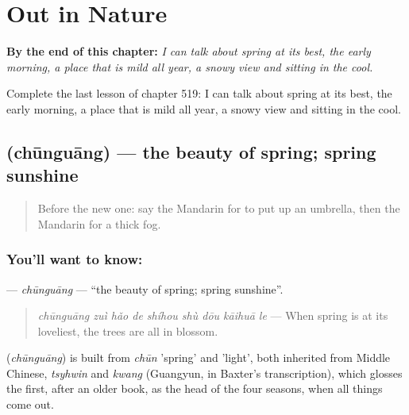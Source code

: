 
\chapter{Out in Nature}
\label{ch:zh-out-in-nature}

\begin{chapteropening}
\textbf{By the end of this chapter:} \emph{I can talk about spring at its best, the early morning, a place that is mild all year, a snowy view and sitting in the cool.}

Complete the last lesson of chapter 519: I can talk about spring at its best, the early morning, a place that is mild all year, a snowy view and sitting in the cool.
\end{chapteropening}

\section[\texorpdfstring{\zh{春光} (chūnguāng)}{春光 (chūnguāng)}]{ (chūnguāng) — the beauty of spring; spring sunshine}

\label{lesson:ZH-C519-chunguang}



\begin{quote}
Before the new one: say the Mandarin for to put up an umbrella, then the Mandarin for a thick fog.
\end{quote}

\subsection*{You'll want to know: }
\textbf{} — \emph{chūnguāng} — \textquotedblleft{}the beauty of spring; spring sunshine\textquotedblright{}.

\begin{quote}
\textbf{} \emph{chūnguāng zuì hǎo de shíhou shù dōu kāihuā le} — When spring is at its loveliest, the trees are all in blossom.
\end{quote}

\begin{cousinweb}
\textbf{} (\emph{chūnguāng}) is built from \emph{chūn} 'spring' and  'light', both inherited from Middle Chinese, \emph{tsyhwin} and \emph{kwang} (Guangyun, in Baxter's transcription), which glosses the first, after an older book, as the head of the four seasons, when all things come out.
\end{cousinweb}

